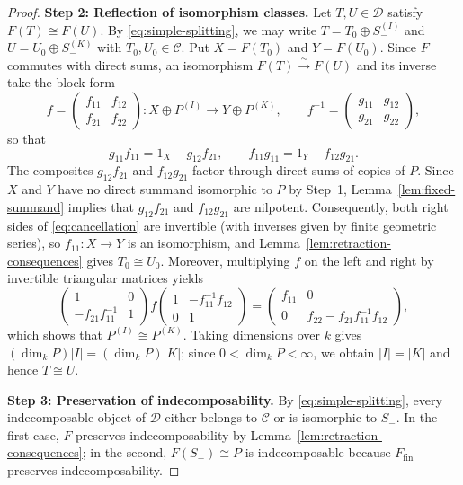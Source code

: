 \documentclass[a4paper,reqno,10pt]{amsart}
\theoremstyle{definition}
\newcommand{\dm}{\dim_k}
\newcommand{\D}{\mathcal D}
\newcommand{\C}{\mathcal C}
\numberwithin{equation}{section}
\begin{document}
\begin{proof}
\noindent\textbf{Step 2: Reflection of isomorphism classes.}
Let $T,U\in\D$ satisfy $F(T)\cong F(U)$. By
\eqref{eq:simple-splitting}, we may write $T=T_0\oplus S_-^{(I)}$ and
$U=U_0\oplus S_-^{(K)}$ with $T_0,U_0\in\C$. Put $X=F(T_0)$ and
$Y=F(U_0)$. Since $F$ commutes with direct sums, an
isomorphism $F(T)\xrightarrow{\sim}F(U)$ and its inverse take the block form
\[
 f=\begin{pmatrix}f_{11}&f_{12}\\f_{21}&f_{22}\end{pmatrix}:
 X\oplus P^{(I)}\longrightarrow Y\oplus P^{(K)},\qquad
 f^{-1}=\begin{pmatrix}g_{11}&g_{12}\\g_{21}&g_{22}\end{pmatrix},
\]
so that
\begin{equation}\label{eq:cancellation}
 g_{11}f_{11}=1_X-g_{12}f_{21},\qquad
 f_{11}g_{11}=1_Y-f_{12}g_{21}.
\end{equation}
The composites $g_{12}f_{21}$ and $f_{12}g_{21}$ factor through direct sums of
copies of $P$. Since $X$ and $Y$ have no direct
summand isomorphic to $P$ by Step~1, Lemma~\ref{lem:fixed-summand} implies that
$g_{12}f_{21}$ and $f_{12}g_{21}$ are nilpotent. Consequently, both
right sides of \eqref{eq:cancellation} are invertible (with inverses given
by finite geometric series), so $f_{11}:X\to Y$ is an isomorphism, and
Lemma~\ref{lem:retraction-consequences} gives $T_0\cong U_0$.
Moreover, multiplying $f$ on the left and right by invertible triangular matrices
yields
\[
 \begin{pmatrix}1&0\\-f_{21}f_{11}^{-1}&1\end{pmatrix}
 f\begin{pmatrix}1&-f_{11}^{-1}f_{12}\\0&1\end{pmatrix}
 =\begin{pmatrix}f_{11}&0\\0&f_{22}-f_{21}f_{11}^{-1}f_{12}\end{pmatrix},
\]
which shows that $P^{(I)}\cong P^{(K)}$. Taking dimensions over $k$ gives $(\dm P)|I|=(\dm P)|K|$;
since $0<\dm P<\infty$, we obtain $|I|=|K|$ and hence $T\cong U$.

\noindent\textbf{Step 3: Preservation of indecomposability.}
By
\eqref{eq:simple-splitting}, every indecomposable object of $\D$ either
belongs to $\C$ or is isomorphic to $S_-$.
In the first case, $F$ preserves indecomposability by Lemma~\ref{lem:retraction-consequences}; in the
second, $F(S_-)\cong P$ is indecomposable because $F_{\mathrm{fin}}$ preserves indecomposability.
\end{proof}
\end{document}
